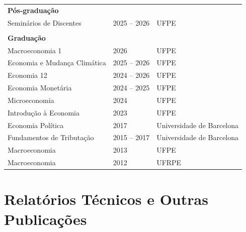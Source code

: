 \documentclass[a4paper,9pt]{article}
\begin{document}
\begin{flushleft}
\begin{tabular}{lll}
\multicolumn{3}{l}{\textbf{Pós-graduação}} \\
Seminários de Discentes & 2025 -- 2026 & UFPE \\
\\
\multicolumn{3}{l}{\textbf{Graduação}} \\
Macroeconomia 1 & 2026 & UFPE \\
Economia e Mudança Climática & 2025 -- 2026 & UFPE \\
Economia 12 & 2024 -- 2026 & UFPE \\
Economia Monetária & 2024 -- 2025 & UFPE \\
Microeconomia & 2024 & UFPE \\
Introdução à Economia & 2023 & UFPE \\
Economia Política & 2017 & Universidade de Barcelona \\
Fundamentos de Tributação & 2015 -- 2017 & Universidade de Barcelona \\
Macroeconomia & 2013 & UFPE \\
Macroeconomia & 2012 & UFRPE \\
\end{tabular}
\end{flushleft}

\vspace*{0.1mm}

\section*{Relatórios Técnicos e Outras Publicações}
\end{document}
